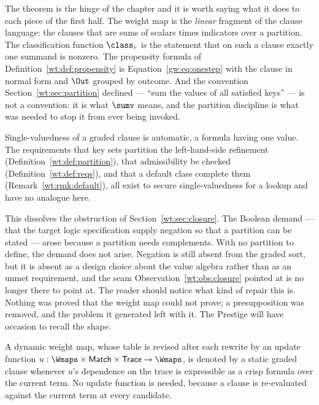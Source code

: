 The theorem is the hinge of the chapter and it is worth saying what it does to each piece
of the first half. The weight map is the \emph{linear} fragment of the clause language:
the clauses that are sums of scalars times indicators over a partition. The
classification function $\class_r$ is the statement that on such a clause exactly one
summand is nonzero. The propensity formula of Definition~\ref{wt:def:propensity} is
Equation~\eqref{gw:eq:onestep} with the clause in normal form and $\Out$ grouped by
outcome. And the convention Section~\ref{wt:sec:partition} declined --- ``sum the values
of all satisfied keys'' --- is not a convention: it is what $\sumv$ means, and the
partition discipline is what was needed to stop it from ever being invoked.

\begin{corollary}
\label{gw:cor:nopartition}
Single-valuedness of a graded clause is automatic, a formula having one value. The
requirements that key sets partition the left-hand-side refinement
(Definition~\ref{wt:def:partition}), that admissibility be checked
(Definition~\ref{wt:def:reqs}), and that a default class complete them
(Remark~\ref{wt:rmk:default}), all exist to secure single-valuedness for a lookup and
have no analogue here.
\end{corollary}

This dissolves the obstruction of Section~\ref{wt:sec:closure}. The Boolean demand ---
that the target logic specification supply negation so that a partition can be stated
--- arose because a partition needs complements. With no partition to define, the demand
does not arise. Negation is still absent from the graded sort, but it is absent as a
design choice about the value algebra rather than as an unmet requirement, and the seam
Observation~\ref{wt:obs:closure} pointed at is no longer there to point at. The reader
should notice what kind of repair this is. Nothing was proved that the weight map could
not prove; a presupposition was removed, and the problem it generated left with it. The
Prestige will have occasion to recall the shape.

\begin{proposition}
\label{gw:prop:plastic}
A dynamic weight map, whose table is revised after each rewrite by an update function
$u : \Wmaps \times \textsf{Match} \times \textsf{Trace} \to \Wmaps$, is denoted by a
static graded clause whenever $u$'s dependence on the trace is expressible as a crisp
formula over the current term. No update function is needed, because a clause is
re-evaluated against the current term at every candidate.
\end{proposition}

